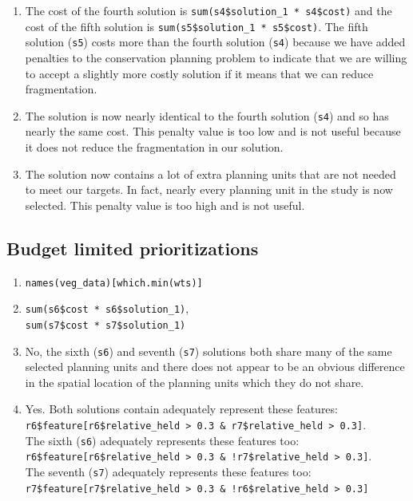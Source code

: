 \documentclass[
  12pt,
]{book}
\makeatletter
\providecommand{\tightlist}{%
  \setlength{\itemsep}{0pt}\setlength{\parskip}{0pt}}
\newenvironment{kframe}{%
\medskip{}
\setlength{\fboxsep}{.8em}
 \def\at@end@of@kframe{}%
 \ifinner\ifhmode%
  \def\at@end@of@kframe{\end{minipage}}%
  \begin{minipage}{\columnwidth}%
 \fi\fi%
 \def\FrameCommand##1{\hskip\@totalleftmargin \hskip-\fboxsep
 \colorbox{shadecolor}{##1}\hskip-\fboxsep
     \hskip-\linewidth \hskip-\@totalleftmargin \hskip\columnwidth}%
 \MakeFramed {\advance\hsize-\width
   \@totalleftmargin\z@ \linewidth\hsize
   \@setminipage}}%
 {\par\unskip\endMakeFramed%
 \at@end@of@kframe}
\newenvironment{rmdblock}[1]
  {
  \begin{itemize}
  \renewcommand{\labelitemi}{
    \raisebox{-.7\height}[0pt][0pt]{
      {\setkeys{Gin}{width=3em,keepaspectratio}\texttt{[image: images/\#1]}}
    }
  }
  \setlength{\fboxsep}{1em}
  \begin{kframe}
  \item
  }
  {
  \end{kframe}
  \end{itemize}
  }
\newenvironment{rmdanswer}
  {\begin{rmdblock}{answer}}
  {\end{rmdblock}}
\makeatother
\begin{document}
\begin{rmdanswer}
\begin{enumerate}
\def\labelenumi{\arabic{enumi}.}
\tightlist
\item
  The cost of the fourth solution is \texttt{sum(s4\$solution\_1\ *\ s4\$cost)} and the cost of the fifth solution is \texttt{sum(s5\$solution\_1\ *\ s5\$cost)}. The fifth solution (\texttt{s5}) costs more than the fourth solution (\texttt{s4}) because we have added penalties to the conservation planning problem to indicate that we are willing to accept a slightly more costly solution if it means that we can reduce fragmentation.
\item
  The solution is now nearly identical to the fourth solution (\texttt{s4}) and so has nearly the same cost. This penalty value is too low and is not useful because it does not reduce the fragmentation in our solution.
\item
  The solution now contains a lot of extra planning units that are not needed to meet our targets. In fact, nearly every planning unit in the study is now selected. This penalty value is too high and is not useful.
\end{enumerate}
\end{rmdanswer}

\hypertarget{budget-limited-prioritizations-1}{%
\subsection{Budget limited prioritizations}\label{budget-limited-prioritizations-1}}

\begin{rmdanswer}
\begin{enumerate}
\def\labelenumi{\arabic{enumi}.}
\tightlist
\item
  \texttt{names(veg\_data){[}which.min(wts){]}}
\item
  \texttt{sum(s6\$cost\ *\ s6\$solution\_1)},\\
  \texttt{sum(s7\$cost\ *\ s7\$solution\_1)}
\item
  No, the sixth (\texttt{s6}) and seventh (\texttt{s7}) solutions both share many of the same selected planning units and there does not appear to be an obvious difference in the spatial location of the planning units which they do not share.
\item
  Yes. Both solutions contain adequately represent these features:\\
  \texttt{r6\$feature{[}r6\$relative\_held\ \textgreater{}\ 0.3\ \&\ r7\$relative\_held\ \textgreater{}\ 0.3{]}}.\\
  The sixth (\texttt{s6}) adequately represents these features too:\\
  \texttt{r6\$feature{[}r6\$relative\_held\ \textgreater{}\ 0.3\ \&\ !r7\$relative\_held\ \textgreater{}\ 0.3{]}}.\\
  The seventh (\texttt{s7}) adequately represents these features too:\\
  \texttt{r7\$feature{[}r7\$relative\_held\ \textgreater{}\ 0.3\ \&\ !r6\$relative\_held\ \textgreater{}\ 0.3{]}}
\end{enumerate}
\end{rmdanswer}
\end{document}
